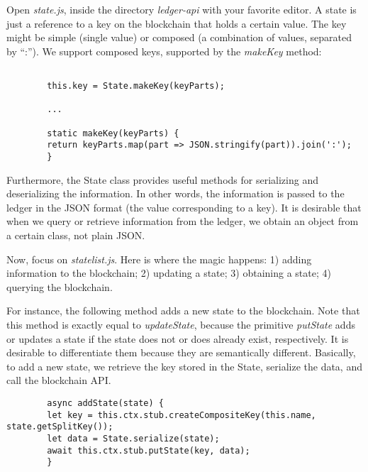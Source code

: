 \documentclass[12pt,a4paper]{article}
\theoremstyle{definition}
\begin{document}
    Open \emph{state.js}, inside the directory \emph{ledger-api} with your favorite editor. A state is just a reference to a key on the blockchain that holds a certain value. The key might be simple (single value) or composed (a combination of values, separated by ``:''). We support composed keys, supported by the \emph{makeKey} method:
    \begin{verbatim}

        this.key = State.makeKey(keyParts);

        ...

        static makeKey(keyParts) {
        return keyParts.map(part => JSON.stringify(part)).join(':');
        }
    \end{verbatim}

    Furthermore, the State class provides useful methods for serializing and deserializing the information. In other words, the information is passed to the ledger in the JSON format (the value corresponding to a key). It is desirable that when we query or retrieve information from the ledger, we obtain an object from a certain class, not plain JSON.

    Now, focus on \emph{statelist.js}. Here is where the magic happens: 1) adding information to the blockchain; 2) updating a state; 3) obtaining a state; 4) querying the blockchain.

    For instance, the following method adds a new state to the blockchain. Note that this method is exactly equal to \emph{updateState}, because the primitive \emph{putState} adds or updates a state if the state does not or does already exist, respectively. It is desirable to differentiate them because they are semantically different. Basically, to add a new state, we retrieve the key stored in the State, serialize the data, and call the blockchain API.

    \begin{verbatim}
        async addState(state) {
        let key = this.ctx.stub.createCompositeKey(this.name, state.getSplitKey());
        let data = State.serialize(state);
        await this.ctx.stub.putState(key, data);
        }

    \end{verbatim}
\end{document}
